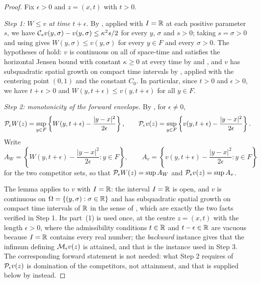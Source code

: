 \begin{proof}
Fix $\epsilon>0$ and $z=(x,t)$ with $t>0$.

\emph{Step 1: $W\le v$ at time $t+\epsilon$.}
By , applied with $I=\mathbb{R}$ at each positive parameter
$s$, we have $\mathcal{C}_sv(y,\sigma)-v(y,\sigma)\le\kappa^2s/2$ for every $y$,
$\sigma$ and $s>0$; taking $s=\sigma>0$ and using  gives
$W(y,\sigma)\le v(y,\sigma)$ for every $y\in F$ and every $\sigma>0$. The
hypotheses of  hold: $v$ is continuous on all of
space-time and satisfies the horizontal Jensen bound with constant $\kappa\ge0$
at every time by  and , and $v$ has
subquadratic spatial growth on compact time intervals by
, applied with the centering point $(0,1)$ and the
constant $C_0$. In particular, since $t>0$ and $\epsilon>0$, we have
$t+\epsilon>0$ and $W(y,t+\epsilon)\le v(y,t+\epsilon)$ for all $y\in F$.

\emph{Step 2: monotonicity of the forward envelope.}
By , for $\epsilon\ne0$,
\[
  \mathcal{P}_\epsilon W(z)
   =\sup_{y\in F}\left\{W(y,t+\epsilon)-\frac{|y-x|^2}{2\epsilon}\right\},
  \qquad
  \mathcal{P}_\epsilon v(z)
   =\sup_{y\in F}\left\{v(y,t+\epsilon)-\frac{|y-x|^2}{2\epsilon}\right\}.
\]
Write
\[
  A_W=\left\{W(y,t+\epsilon)-\frac{|y-x|^2}{2\epsilon}:y\in F\right\},
  \qquad
  A_v=\left\{v(y,t+\epsilon)-\frac{|y-x|^2}{2\epsilon}:y\in F\right\}
\]
for the two competitor sets, so that $\mathcal{P}_\epsilon W(z)=\sup A_W$ and
$\mathcal{P}_\epsilon v(z)=\sup A_v$.

The lemma  applies to $v$ with $I=\mathbb{R}$: the interval
$I=\mathbb{R}$ is open, and $v$ is continuous on $\Omega=\{(y,\sigma):\sigma\in\mathbb{R}\}$ and
has subquadratic spatial growth on compact time intervals of $\mathbb{R}$ in the sense
of , which are exactly the two facts verified in
Step 1. Its part~(1) is used once, at the centre $z=(x,t)$ with the length
$\epsilon>0$, where the admissibility conditions $t\in\mathbb{R}$ and $t-\epsilon\in\mathbb{R}$ are
vacuous because $I=\mathbb{R}$ contains every real number; the \emph{backward} instance
gives that the infimum defining $\mathcal{M}_\epsilon v(z)$ is attained, and that is the
instance used in Step 3. The corresponding forward statement is not needed: what
Step 2 requires of $\mathcal{P}_\epsilon v(z)$ is domination of the competitors, not
attainment, and that is supplied below by 
instead.


\end{proof}
